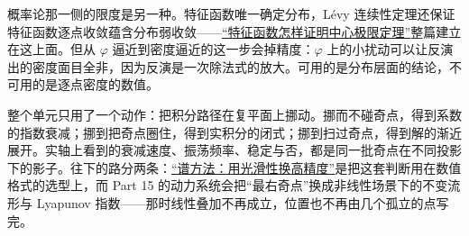 概率论那一侧的限度是另一种。特征函数唯一确定分布，Lévy 连续性定理还保证特征函数逐点收敛蕴含分布弱收敛——\hyperref[sec:05-Probability/08-Limit-Theorems/04]{``特征函数怎样证明中心极限定理''}整篇建立在这上面。但从 \(\varphi\) 逼近到密度逼近的这一步会掉精度：\(\varphi\) 上的小扰动可以让反演出的密度面目全非，因为反演是一次除法式的放大。可用的是分布层面的结论，不可用的是逐点密度的数值。

整个单元只用了一个动作：把积分路径在复平面上挪动。挪而不碰奇点，得到系数的指数衰减；挪到把奇点圈住，得到实积分的闭式；挪到扫过奇点，得到解的渐近展开。实轴上看到的衰减速度、振荡频率、稳定与否，都是同一批奇点在不同投影下的影子。往下的路分两条：\hyperref[sec:08-Numerical-Analysis/08-Fourier-and-Spectral-Methods/04]{``谱方法：用光滑性换高精度''}是把这套判断用在数值格式的选型上，而 Part 15 的动力系统会把``最右奇点''换成非线性场景下的不变流形与 Lyapunov 指数——那时线性叠加不再成立，位置也不再由几个孤立的点写完。
